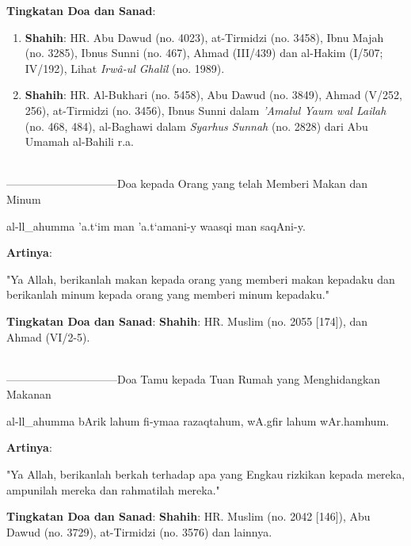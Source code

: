 \documentclass[a4paper,12pt]{article}
\begin{document}
\noindent
\textbf{Tingkatan Doa dan Sanad}:
\begin{enumerate}
\item \textbf{Shahih}: HR. Abu Dawud (no. 4023), at-Tirmidzi (no. 3458),
Ibnu Majah (no. 3285), Ibnus Sunni (no. 467), Ahmad (III/439) dan al-Hakim 
(I/507; IV/192), Lihat \textit{Irw\^{a}-ul Ghal\^{i}l} (no. 1989).
\item \textbf{Shahih}: HR. Al-Bukhari (no. 5458), Abu Dawud (no. 3849), 
Ahmad (V/252, 256), at-Tirmidzi (no. 3456), Ibnus Sunni dalam 
\textit{'Amalul Yaum wal Lailah} (no. 468, 484), al-Baghawi dalam 
\textit{Syarhus Sunnah} (no. 2828) dari Abu Umamah al-Bahili r.a.\\\\
\end{enumerate}
\par
{}------------------------------Doa kepada Orang yang telah Memberi Makan dan Minum
\begin{arabtext}
\noindent
al-ll_ahumma 'a.t`im man 'a.t`amani-y waasqi man saqAni-y.\\
\end{arabtext}
\noindent
\textbf{Artinya}:
\par
\indent
"Ya Allah, berikanlah makan kepada orang yang memberi makan kepadaku dan 
berikanlah minum kepada orang yang memberi minum kepadaku."\\
\par
\noindent
\textbf{Tingkatan Doa dan Sanad}: \textbf{Shahih}: HR. Muslim (no.  2055 
[174]), dan Ahmad (VI/2-5). \\\\
\par
{}------------------------------Doa Tamu kepada Tuan Rumah yang Menghidangkan Makanan
\begin{arabtext}
\noindent
al-ll_ahumma bArik lahum fi-ymaa razaqtahum, wA.gfir lahum wAr.hamhum.\\
\end{arabtext}
\noindent
\textbf{Artinya}:
\par
\indent
"Ya Allah, berikanlah berkah terhadap apa yang Engkau rizkikan kepada 
mereka, ampunilah mereka dan rahmatilah mereka."\\
\par
\noindent
\textbf{Tingkatan Doa dan Sanad}: \textbf{Shahih}: HR. Muslim (no. 2042 
[146]), Abu Dawud (no. 3729), at-Tirmidzi (no. 3576) dan lainnya. \\\\
\par
\end{document}
